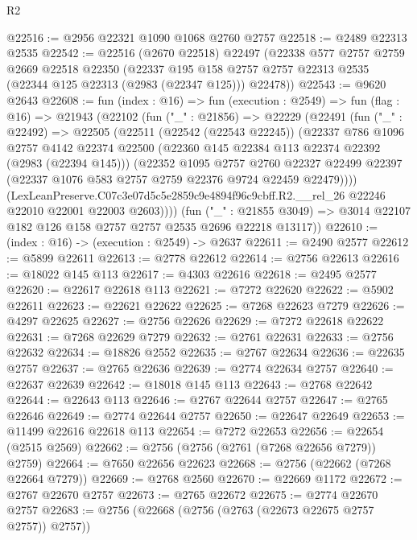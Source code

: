 \begin{lexlean}{R2}
\begin{coremodule}
@22516 := @2956 @22321 @1090 @1068 @2760 @2757
@22518 := @2489 @22313 @2535
@22542 := @22516
    (@2670 @22518)
    @22497
    (@22338
      @577
      @2757
      @2759
      @2669
      @22518
      @22350
      (@22337 @195 @158 @2757 @2757 @22313 @2535 (@22344 @125 @22313 (@2983 (@22347 @125))) @22478))
@22543 := @9620 @2643
@22608 := fun (index : @16) =>
  fun (execution : @2549) =>
  fun (flag : @16) =>
  @21943
    (@22102
      (fun ("_" : @21856) =>
      @22229
        (@22491
          (fun ("_" : @22492) =>
          @22505
            (@22511
              (@22542 (@22543 @22245))
              (@22337
                @786
                @1096
                @2757
                @4142
                @22374
                @22500
                (@22360 @145 @22384 @113 @22374 @22392 (@2983 (@22394 @145)))
                (@22352
                  @1095
                  @2757
                  @2760
                  @22327
                  @22499
                  @22397
                  (@22337 @1076 @583 @2757 @2759 @22376 @9724 @22459 @22479))))
            (LexLeanPreserve.C07c3e07d5c5e2859c9e4894f96c9cbff.R2.__rel_26
              @22246
              @22010
              @22001
              @22003
              @2603))))
      (fun ("_" : @21855 @3049) =>
      @3014 @22107 @182 @126 @158 @2757 @2757 @2535 @2696 @22218 @13117))
@22610 := (index : @16) -> (execution : @2549) -> @2637
@22611 := @2490 @2577
@22612 := @5899 @22611
@22613 := @2778 @22612
@22614 := @2756 @22613
@22616 := @18022 @145 @113
@22617 := @4303 @22616
@22618 := @2495 @2577
@22620 := @22617 @22618 @113
@22621 := @7272 @22620
@22622 := @5902 @22611
@22623 := @22621 @22622
@22625 := @7268 @22623 @7279
@22626 := @4297 @22625
@22627 := @2756 @22626
@22629 := @7272 @22618 @22622
@22631 := @7268 @22629 @7279
@22632 := @2761 @22631
@22633 := @2756 @22632
@22634 := @18826 @2552
@22635 := @2767 @22634
@22636 := @22635 @2757
@22637 := @2765 @22636
@22639 := @2774 @22634 @2757
@22640 := @22637 @22639
@22642 := @18018 @145 @113
@22643 := @2768 @22642
@22644 := @22643 @113
@22646 := @2767 @22644 @2757
@22647 := @2765 @22646
@22649 := @2774 @22644 @2757
@22650 := @22647 @22649
@22653 := @11499 @22616 @22618 @113
@22654 := @7272 @22653
@22656 := @22654 (@2515 @2569)
@22662 := @2756 (@2756 (@2761 (@7268 @22656 @7279)) @2759)
@22664 := @7650 @22656 @22623
@22668 := @2756 (@22662 (@7268 @22664 @7279))
@22669 := @2768 @2560
@22670 := @22669 @1172
@22672 := @2767 @22670 @2757
@22673 := @2765 @22672
@22675 := @2774 @22670 @2757
@22683 := @2756 (@22668 (@2756 (@2763 (@22673 @22675 @2757 @2757)) @2757))

\end{coremodule}
\end{lexlean}
